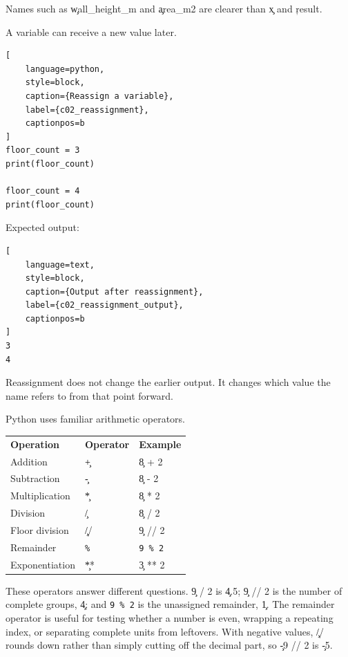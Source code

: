 Names such as \c{wall_height_m} and \c{area_m2} are clearer than \c{x} and
\c{result}.


A variable can receive a new value later.

\begin{lstlisting}[
    language=python,
    style=block,
    caption={Reassign a variable},
    label={c02_reassignment},
    captionpos=b
]
floor_count = 3
print(floor_count)

floor_count = 4
print(floor_count)
\end{lstlisting}

Expected output:

\begin{lstlisting}[
    language=text,
    style=block,
    caption={Output after reassignment},
    label={c02_reassignment_output},
    captionpos=b
]
3
4
\end{lstlisting}

Reassignment does not change the earlier output. It changes which value the
name refers to from that point forward.


Python uses familiar arithmetic operators.

\begin{center}
\begin{tabular}{lll}
\textbf{Operation} & \textbf{Operator} & \textbf{Example} \\
Addition & \c{+} & \c{8 + 2} \\
Subtraction & \c{-} & \c{8 - 2} \\
Multiplication & \c{*} & \c{8 * 2} \\
Division & \c{/} & \c{8 / 2} \\
Floor division & \c{//} & \c{9 // 2} \\
Remainder & \texttt{\%} & \texttt{9 \% 2} \\
Exponentiation & \c{**} & \c{3 ** 2} \\
\end{tabular}
\end{center}

These operators answer different questions. \c{9 / 2} is \c{4.5};
\c{9 // 2} is the number of complete groups, \c{4}; and \texttt{9 \% 2} is the
unassigned remainder, \c{1}. The remainder operator is useful for testing
whether a number is even, wrapping a repeating index, or separating complete
units from leftovers. With negative values, \c{//} rounds down rather than
simply cutting off the decimal part, so \c{-9 // 2} is \c{-5}.

